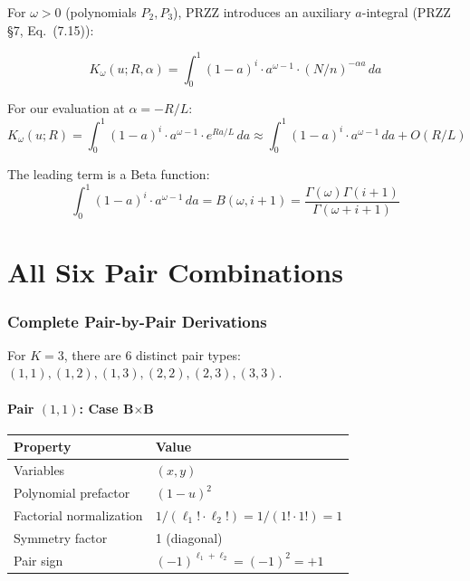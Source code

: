 \documentclass[11pt]{article}
\begin{document}
For $\omega > 0$ (polynomials $P_2, P_3$), PRZZ introduces an auxiliary $a$-integral (PRZZ \S7, Eq.~(7.15)):

\begin{equation}
\boxed{
K_\omega(u; R, \alpha) = \int_0^1 (1-a)^i \cdot a^{\omega-1} \cdot (N/n)^{-\alpha a} \, da
}
\end{equation}

For our evaluation at $\alpha = -R/L$:
\begin{equation}
K_\omega(u; R) = \int_0^1 (1-a)^i \cdot a^{\omega-1} \cdot e^{Ra/L} \, da \approx \int_0^1 (1-a)^i \cdot a^{\omega-1} \, da + O(R/L)
\end{equation}

The leading term is a Beta function:
\begin{equation}
\int_0^1 (1-a)^i \cdot a^{\omega-1} \, da = B(\omega, i+1) = \frac{\Gamma(\omega)\Gamma(i+1)}{\Gamma(\omega+i+1)}
\end{equation}


\part{All Six Pair Combinations}

\section{Complete Pair-by-Pair Derivations}
\label{sec:pairs}

For $K=3$, there are 6 distinct pair types: $(1,1), (1,2), (1,3), (2,2), (2,3), (3,3)$.

\subsection{Pair $(1,1)$: Case B$\times$B}

\begin{center}
\begin{tabular}{ll}
\toprule
Property & Value \\
\midrule
Variables & $(x, y)$ \\
Polynomial prefactor & $(1-u)^2$ \\
Factorial normalization & $1/(\ell_1! \cdot \ell_2!) = 1/(1! \cdot 1!) = 1$ \\
Symmetry factor & 1 (diagonal) \\
Pair sign & $(-1)^{\ell_1+\ell_2} = (-1)^2 = +1$ \\
\bottomrule
\end{tabular}
\end{center}
\end{document}
